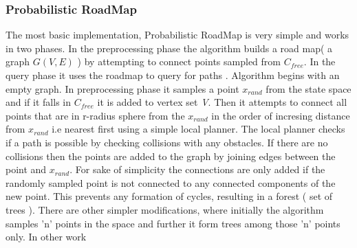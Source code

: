 \documentclass[MTech]{iitmdiss}
\begin{document}
\subsubsection{Probabilistic RoadMap}
The most basic implementation, Probabilistic RoadMap is very simple and works in two phases. In the preprocessing phase the algorithm builds a road map( a graph $G(V,E)$ )  by attempting to connect points sampled from $C_{free} $. In the query phase it uses the roadmap to query for paths . Algorithm begins with an empty graph. In preprocessing phase it samples a point $x_{rand}$ from the state space and if it falls in $C_{free}$ it is added to vertex set \emph{V}. Then it attempts to connect all points that are in r-radius sphere from the $x_{rand}$ in the order of incresing distance from $x_{rand}$ i.e nearest first using a simple local planner. The local planner checks if a path is possible by checking collisions with any obstacles. If there are no collisions then the points are added to the graph by joining edges between the point and $x_{rand}$. For sake of simplicity the connections are only added if the randomly sampled point is not connected to any connected components of the new point. This prevents any formation of cycles, resulting in a forest ( set of trees ). There are other simpler modifications, where initially the algorithm samples 'n' points in the space and further it form trees among those 'n' points only. In other work \cite{lav06}
\end{document}
